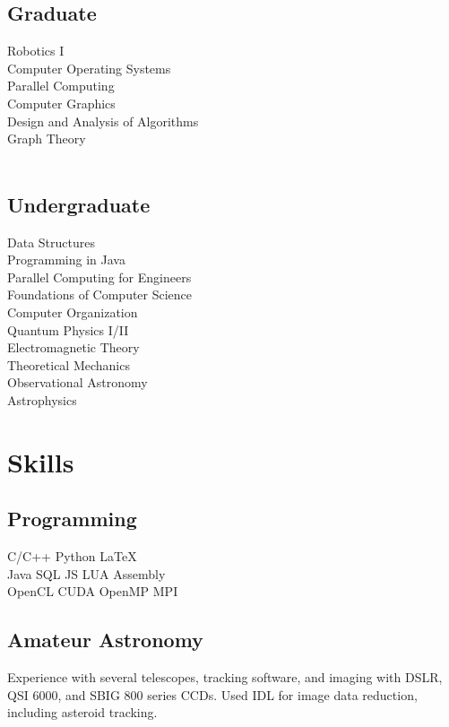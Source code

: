 \documentclass[letterpaper]{deedy-resume} %
\begin{document}
\begin{minipage}[t]{0.33\textwidth}
\subsection{Graduate}
Robotics I\\
Computer Operating Systems\\
Parallel Computing\\
Computer Graphics\\
Design and Analysis of Algorithms\\
Graph Theory\\~\\
\subsection{Undergraduate}
Data Structures\\
Programming in Java\\
Parallel Computing for Engineers\\
Foundations of Computer Science\\
Computer Organization\\
Quantum Physics I/II\\
Electromagnetic Theory\\
Theoretical Mechanics\\
Observational Astronomy\\
Astrophysics


\section{Skills}

\subsection{Programming}

C/C++ \textbullet{} Python \textbullet{} \LaTeX\ \\ 
Java \textbullet{} SQL \textbullet{} JS \textbullet{} LUA \textbullet{} Assembly \\
OpenCL \textbullet{} CUDA \textbullet{} OpenMP \textbullet{} MPI

\subsection{Amateur Astronomy}
Experience with several telescopes, tracking software, and imaging with DSLR, QSI 6000, and SBIG 800 series CCDs. Used IDL for image data reduction, including asteroid tracking.
\sectionspace %


\end{minipage} %
\end{document}
